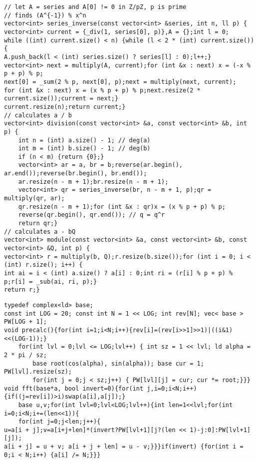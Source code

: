 \documentclass[12pt]{article}
\begin{document}
\begin{verbatim}
// let A = series and A[0] != 0 in Z/pZ, p is prime
// finds (A^{-1}) % x^n
vector<int> series_inverse(const vector<int> &series, int n, ll p) {
vector<int> current = {_div(1, series[0], p)},A = {};int l = 0;
while ((int) current.size() < n) {while (l < 2 * (int) current.size()) {
A.push_back(l < (int) series.size() ? series[l] : 0);l++;}
vector<int> next = multiply(A, current);for (int &x : next) x = (-x % p + p) % p;
next[0] = _sum(2 % p, next[0], p);next = multiply(next, current);
for (int &x : next) x = (x % p + p) % p;next.resize(2 * current.size());current = next;}
current.resize(n);return current;}
// calculates a / b
vector<int> division(const vector<int> &a, const vector<int> &b, int p) {
    int n = (int) a.size() - 1; // deg(a)
    int m = (int) b.size() - 1; // deg(b)
    if (n < m) {return {0};}
    vector<int> ar = a, br = b;reverse(ar.begin(), ar.end());reverse(br.begin(), br.end());
    ar.resize(n - m + 1);br.resize(n - m + 1);
    vector<int> qr = series_inverse(br, n - m + 1, p);qr = multiply(qr, ar);
    qr.resize(n - m + 1);for (int &x : qr)x = (x % p + p) % p;
    reverse(qr.begin(), qr.end()); // q = q^r
    return qr;}
// calculates a - bQ
vector<int> module(const vector<int> &a, const vector<int> &b, const vector<int> &Q, int p) {
vector<int> r = multiply(b, Q);r.resize(b.size());for (int i = 0; i < (int) r.size(); i++) {
int ai = i < (int) a.size() ? a[i] : 0;int ri = (r[i] % p + p) % p;r[i] = _sub(ai, ri, p);}
return r;}
\end{verbatim}

\begin{verbatim}
typedef complex<ld> base;
const int LOG = 20; const int N = 1 << LOG; int rev[N]; vec< base > PW[LOG + 1];
void precalc(){for(int i=1;i<N;i++){rev[i]=(rev[i>>1]>>1)|((i&1)<<(LOG-1));}
    for(int lvl = 0;lvl <= LOG;lvl++) { int sz = 1 << lvl; ld alpha = 2 * pi / sz;
        base root(cos(alpha), sin(alpha)); base cur = 1; PW[lvl].resize(sz);
        for(int j = 0;j < sz;j++) { PW[lvl][j] = cur; cur *= root;}}}
void fft(base*a, bool invert=0){for(int j,i=0;i<N;i++){if((j=rev[i])>i)swap(a[i],a[j]);}
    base u,v;for(int lvl=0;lvl<LOG;lvl++){int len=1<<lvl;for(int i=0;i<N;i+=(len<<1)){
    for(int j=0;j<len;j++){
u=a[i + j];v=a[i+j+len]*(invert?PW[lvl+1][j?(len << 1)-j:0]:PW[lvl+1][j]);
a[i + j] = u + v; a[i + j + len] = u - v;}}}if(invert) {for(int i = 0;i < N;i++) {a[i] /= N;}}}
\end{verbatim}
\end{document}
